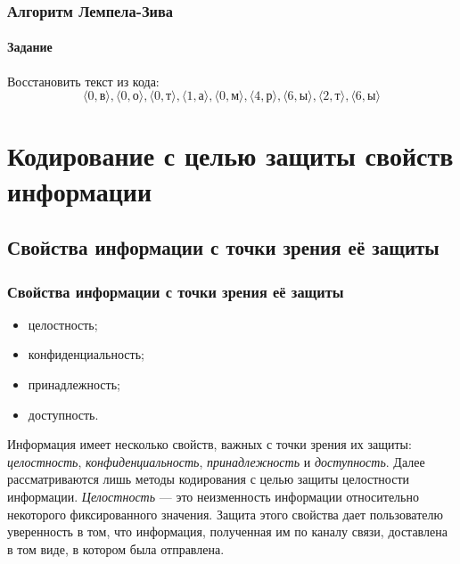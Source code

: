 \begin{frame}
    \frametitle{Алгоритм Лемпела-Зива}
    \framesubtitle{Задание}
    
    Восстановить текст из кода:
    \[
        \langle 0,\text{в}\rangle,
        \langle 0,\text{о}\rangle,
        \langle 0,\text{т}\rangle,
        \langle 1,\text{а}\rangle,
        \langle 0,\text{м}\rangle,
        \langle 4,\text{р}\rangle,
        \langle 6,\text{ы}\rangle,
        \langle 2,\text{т}\rangle,
        \langle 6,\text{ы}\rangle    
    \]
\end{frame}


\section{Кодирование с целью защиты свойств информации}


\subsection{Свойства информации с точки зрения её защиты}

\begin{frame}
    \frametitle{Свойства информации с точки зрения её защиты}
    
    \begin{itemize}
        \item целостность;
        \item конфиденциальность;
        \item принадлежность;
        \item доступность.
    \end{itemize}
\end{frame}

Информация имеет несколько свойств, важных с точки зрения их защиты: \emph{целостность}, \emph{конфиденциальность}, \emph{принадлежность} и \emph{доступность}. Далее рассматриваются лишь методы кодирования с целью защиты целостности информации. \emph{Целостность} --- это неизменность информации относительно некоторого фиксированного значения. Защита этого свойства дает пользователю уверенность в том, что информация, полученная им по каналу связи, доставлена в том виде, в котором была отправлена.


